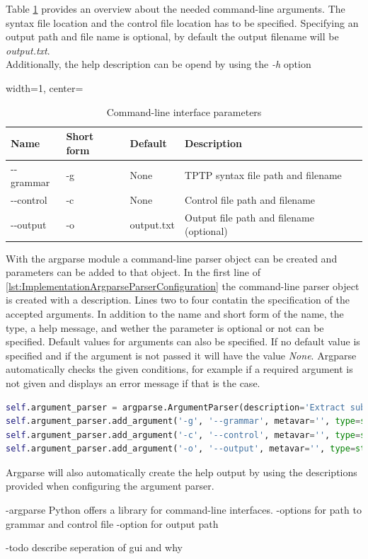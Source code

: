 Table \ref{tbl:ImplementationCommandLineParameters} provides an overview about the needed command-line arguments.
The syntax file location and the control file location has to be specified.
Specifying an output path and file name is optional, by default the output filename will be \textit{output.txt}.\\
Additionally, the help description can be opend by using the \textit{-h} option
\begin{table}[H]
\centering
\caption{Command-line interface parameters}
\begin{adjustbox}{width=1\textwidth, center=\textwidth}
\renewcommand{\arraystretch}{2}
\begin{tabular}{llll}
\textbf{Name} & \textbf{Short form} & \textbf{Default} & \textbf{Description}\\\hline
-{}-grammar & -g & None & \ac{TPTP} syntax file path and filename\\
-{}-control & -c & None &  Control file path and filename\\
-{}-output & -o & output.txt & Output file path and filename (optional)
\end{tabular}
\end{adjustbox}
\label{tbl:ImplementationCommandLineParameters}
\end{table}

With the argparse module a command-line parser object can be created and parameters can be added to that object.
In the first line of \ref{lst:ImplementationArgparseParserConfiguration} the command-line parser object is created with a description.
Lines two to four contatin the specification of the accepted arguments.
In addition to the name and short form of the name, the type, a help message, and wether the parameter is optional or not can be specified.
Default values for arguments can also be specified.
If no default value is specified and if the argument is not passed it will have the value \textit{None}.
Argparse automatically checks the given conditions, for example if a required argument is not given and displays an error message if that is the case.
\begin{lstlisting}[language=Python, basicstyle=\scriptsize	,caption= Argparse command-line parser configuration,label= lst:ImplementationArgparseParserConfiguration]
self.argument_parser = argparse.ArgumentParser(description='Extract sub-syntax using TPTP syntax file and a control file')
self.argument_parser.add_argument('-g', '--grammar', metavar='', type=str, required=True, help='path of the TPTP syntax file')
self.argument_parser.add_argument('-c', '--control', metavar='', type=str, required=True, help='path of the control file')
self.argument_parser.add_argument('-o', '--output', metavar='', type=str, required=False, help='optional output file name (default output.txt)', default= "output.txt")
\end{lstlisting}

Argparse will also automatically create the help output by using the descriptions provided when configuring the argument parser.


-argparse Python offers a library for command-line interfaces.
-options for path to grammar and control file
-option for output path

-todo describe seperation of gui and why
